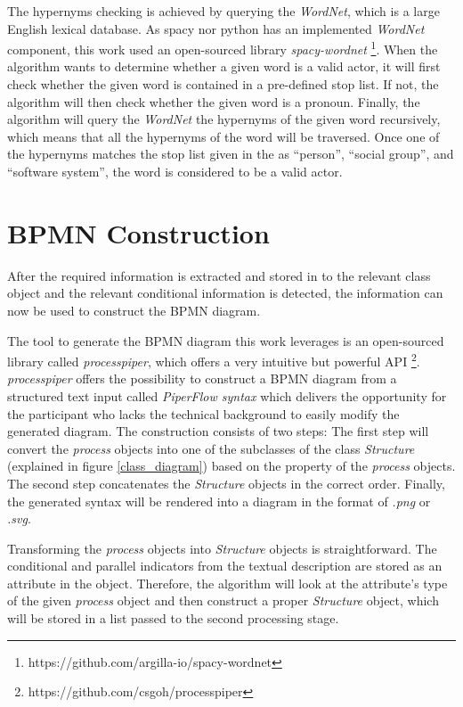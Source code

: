 The hypernyms checking is achieved by querying the \textit{WordNet}, which is a large English lexical database. As spacy nor python has an implemented \textit{WordNet} component, this work used an open-sourced library \textit{spacy-wordnet} \footnote{https://github.com/argilla-io/spacy-wordnet}. When the algorithm wants to determine whether a given word is a valid actor, it will first check whether the given word is contained in a pre-defined stop list. If not, the algorithm will then check whether the given word is a pronoun. Finally, the algorithm will query the \textit{WordNet} the hypernyms of the given word recursively, which means that all the hypernyms of the word will be traversed. Once one of the hypernyms matches the stop list given in the \cite{t2m_1_main} as “person”, “social group”, and “software system”, the word is considered to be a valid actor.

\section{BPMN Construction}
After the required information is extracted and stored in to the relevant class object and the relevant conditional information is detected, the information can now be used to construct the BPMN diagram. 

The tool to generate the BPMN diagram this work leverages is an open-sourced library called \textit{processpiper}, which offers a very intuitive but powerful API \footnote{https://github.com/csgoh/processpiper}. \textit{processpiper} offers the possibility to construct a BPMN diagram from a structured text input called \textit{PiperFlow syntax} which delivers the opportunity for the participant who lacks the technical background to easily modify the generated diagram. The construction consists of two steps: The first step will convert the \textit{process} objects into one of the subclasses of the class \textit{Structure} (explained in figure \ref{class_diagram}) based on the property of the \textit{process} objects. The second step concatenates the \textit{Structure} objects in the correct order. Finally, the generated syntax will be rendered into a diagram in the format of \textit{.png} or \textit{.svg}.\

Transforming the \textit{process} objects into \textit{Structure} objects is straightforward. The conditional and parallel indicators from the textual description are stored as an attribute in the object. Therefore, the algorithm will look at the attribute's type of the given \textit{process} object and then construct a proper \textit{Structure} object, which will be stored in a list passed to the second processing stage. 

